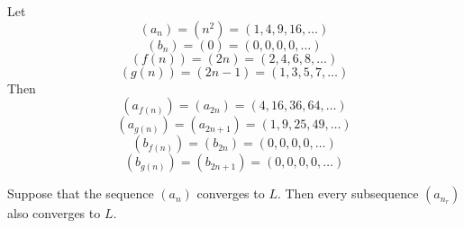 \documentclass[11pt]{article}
\begin{document}
\begin{example}\label{2.4.3}
    Let
    \[
        (a_n) = \left( n^2 \right) = (1, 4, 9, 16, \ldots)
    \]
    \[
        (b_n) = (0) = (0, 0, 0, 0, \ldots)
    \]
    \[
        (f(n)) = (2n) = (2, 4, 6, 8, \ldots)
    \]
    \[
        (g(n)) = (2n - 1) = (1, 3, 5, 7, \ldots)
    \]
    Then
    \[
        (a_{f(n)}) = (a_{2n}) = (4, 16, 36, 64, \ldots)
    \]
    \[
        (a_{g(n)}) = (a_{2n+1}) = (1, 9, 25, 49, \ldots)
    \]
    \[
        (b_{f(n)}) = (b_{2n}) = (0, 0, 0, 0, \ldots)
    \]
    \[
        (b_{g(n)}) = (b_{2n+1}) = (0, 0, 0, 0, \ldots)
    \]
\end{example}

\begin{proposition}\label{2.4.4}
    Suppose that the sequence $(a_n)$ converges to $L$. Then every subsequence $(a_{n_r})$ also converges to $L$.
\end{proposition}
\end{document}
